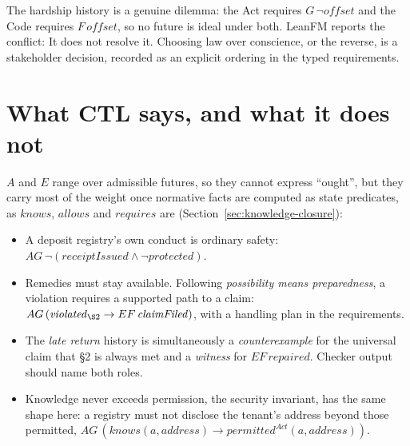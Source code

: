 \begin{table}[ht]
\centering
\small
\resizebox{\textwidth}{!}{}
\caption{Every rule in every history, generated by \texttt{LegalDepositExample.lean}. \S3 is a contrary-to-duty rule: it is triggered only on histories where \S2 was violated.}
\label{tab:legal-status}
\end{table}

\begin{table}[ht]
\centering
\small

\caption{Each history under the Act and under the declared Code, when the landlord first knew the forwarding address, and any normative conflict.}
\label{tab:legal-verdicts}
\end{table}

The hardship history is a genuine dilemma: the Act requires
$G\,\neg\mathit{offset}$ and the Code requires $F\,\mathit{offset}$, so no future is
ideal under both. LeanFM reports the conflict:
It does not resolve it. Choosing law over conscience, or the reverse, is a
stakeholder decision, recorded as an explicit ordering in the typed requirements.

\section{What CTL says, and what it does not}

$A$ and $E$ range over admissible futures, so they cannot express ``ought'', but
they carry most of the weight once normative facts are computed as state
predicates, as $\mathit{knows}$, $\mathit{allows}$ and $\mathit{requires}$ are
(Section~\ref{sec:knowledge-closure}):

\begin{itemize}
\item A deposit registry's own conduct is ordinary safety:
$AG\,\neg(\mathit{receiptIssued}\wedge\neg\mathit{protected})$.
\item Remedies must stay available. Following \emph{possibility means
preparedness}, a violation requires a supported path to a claim:
$AG\,(\mathit{violated}_{\S2}\rightarrow EF\,\mathit{claimFiled})$, with a handling
plan in the requirements.
\item The \emph{late return} history is simultaneously a \emph{counterexample}
for the universal claim that \S2 is always met and a \emph{witness} for
$EF\,\mathit{repaired}$. Checker output should name both roles.
\item Knowledge never exceeds permission, the security invariant, has the same
shape here: a registry must not disclose the tenant's address beyond those
permitted, $AG\,(\mathit{knows}(a,\mathit{address})\rightarrow\mathit{permitted}^{Act}(a,\mathit{address}))$.
\end{itemize}

